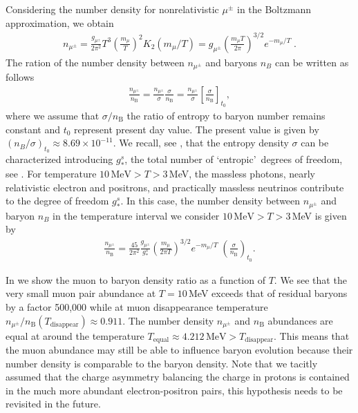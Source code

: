 Considering the number density for nonrelativistic $\mu^\pm$ in the Boltzmann approximation, we obtain
\begin{align}\label{nmupm}
n_{\mu^\pm}=\frac{g_{\mu^\pm}}{2\pi^2}T^3\left(\frac{m_\mu}{T}\right)^2 K_2(m_\mu/T)=g_{\mu^\pm}\left(\frac{m_\mu T}{2\pi}\right)^{3/2}e^{-{m_\mu}/{T}}\;. 
\end{align}
The ration of the number density between $n_{\mu^\pm}$ and baryons $n_B$ can be written as follows
\begin{align}
\frac{n_{\mu^\pm}}{n_\mathrm{B}}=\frac{n_{\mu^\pm}}{\sigma}\frac{\sigma}{n_\mathrm{B}}=
\frac{n_{\mu^\pm}}{\sigma}\left[\frac{\sigma}{n_\mathrm{B}}\right]_{t_0},
\end{align}
where we assume that $\sigma/n_\mathrm{B}$ the ratio of entropy to baryon number remains constant and $t_0$ represent present day value. The present value is given by $(n_B/\sigma)_{t_0}\approx8.69\times10^{-11}$. We recall, see , that the entropy density $\sigma$ can be characterized introducing $g^s_\ast$, the total number of \lq entropic\rq\ degrees of freedom, see .
For temperature $10\,\mathrm{MeV} >T>3 $\,MeV, the massless photons, nearly relativistic electron and positrons, and practically massless neutrinos contribute to the degree of freedom $g^s_\ast$.  In this case, the number density between $n_{\mu^\pm}$ and baryon $n_B$ in the temperature interval we consider $10\,\mathrm{MeV} >T>3 $\,MeV is given by
\begin{align}\label{nmuperbF} 
\frac{n_{\mu^\pm}}{n_\mathrm{B}}=\frac{45}{2\pi^2}\frac{g_{\mu^\pm}}{g^s_\ast}\left(\frac{m_\mu}{2\pi T}\right)^{3/2}e^{-{m_\mu}/{T}}\;\left(\frac{\sigma}{n_\mathrm{B}}\right)_{\!t_0}.
\end{align}

In  we show the muon to baryon density ratio  as a function of $T$. We see that the very small muon pair abundance at $T=10$\,MeV exceeds that of residual baryons by a factor 500,000 while at muon disappearance temperature $n_{\mu^\pm}/n_\mathrm{B}(T_\mathrm{disappear})\approx0.911$. The number density $n_{\mu^\pm}$ and $n_\mathrm{B}$  abundances are equal at around the temperature $T_\mathrm{equal}\approx4.212\,\mathrm{MeV} >  T_\mathrm{disappear}$.  This means that the muon abundance may still be able to influence baryon evolution because their number density is comparable to the baryon density. Note that we tacitly assumed that the charge asymmetry balancing the charge in protons is contained in the much more abundant electron-positron pairs, this hypothesis needs to be revisited in the future.

